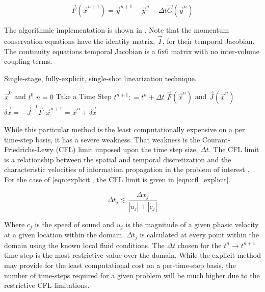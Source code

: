 \begin{equation}
\label{eqn:explicit}
\vec{F}(\vec{x}^{n+1}) = \vec{y}^{n+1} - \vec{y}^{n} - \Delta t \vec{G}(\vec{y}^{n})
\end{equation}

The algorithmic implementation is shown in .
Note that the momentum conservation equations have the identity matrix, $\vec{I}$, for their temporal Jacobian.
The continuity equations temporal Jacobian is a 6x6 matrix with no inter-volume coupling terms.

\begin{algo}[H]
\caption{Single-stage, fully-explicit, single-shot linearization technique.}
\label{algo:explicit}
\setlength{\baselineskip}{0.625\baselineskip}
\begin{algorithmic}[1]
\Require $\vec{x}^{0}$ and $t^{0}$
\Set $n = 0$
\Loop \; Take a Time Step
    \State $t^{n+1} : = t^{n} + \Delta t$
    \Calculate $\vec{F}(\vec{x}^n)$ and $\vec{J}(\vec{x}^n)$
    \Calculate $\vec{\delta x} = -\vec{J}^{-1}\vec{F}$
    \Calculate $\vec{x}^{n+1} = \vec{x}^{n} + \vec{\delta x}$ 
\end{algorithmic}
\end{algo}

While this particular method is the least computationally expensive on a per time-step basis, it has a severe weakness.
That weakness is the Courant-Friedrichs-Lewy (CFL) limit imposed upon the time step size, $\Delta t$.
The CFL limit is a relationship between the spatial and temporal discretization and the characteristic velocities of information propagation in the problem of interest \cite{LeVeque2007, Tannehill1997}.
For the case of \eqref{eqn:explicit}, the CFL limit is given in \eqref{eqn:cfl_explicit}.

\begin{equation}
\label{eqn:cfl_explicit}
\Delta t_j \lesssim \frac{\Delta x_j}{|u_j|+|c_j|}
\end{equation}

Where $c_j$ is the speed of sound and $u_j$ is the magnitude of a given phasic velocity at a given location within the domain.
$\Delta t_j$ is calculated at every point within the domain using the known local fluid conditions.
The $\Delta t$ chosen for the $t^{n} \rightarrow t^{n+1}$ time-step is the most restrictive value over the domain.
While the explicit method may provide for the least computational cost on a per-time-step basis, the number of time-steps required for a given problem will be much higher due to the restrictive CFL limitations.

